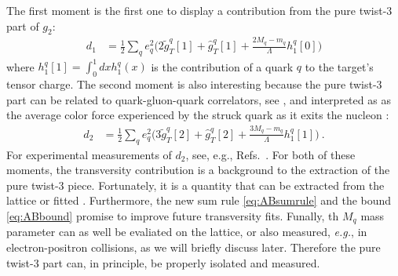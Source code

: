 \documentclass[preprintnumbers,floatfix,nofootinbib]{revtex4}
\newcommand{\eg}{{\em e.g.}}
\newcommand{\mj}{M_q}
\newcommand{\mq}{m_q}
\begin{document}
The first moment is the first one to display a contribution from the pure twist-3 part of $g_2$:
\begin{align}
  d_1 & = \frac12 \sum_q e_q^2 \bigg( 2 \tilde g_T^q[1] + \hat g_T^q[1]
    + \frac{2\mj-\mq}{\Lambda} h_1^q[0] \bigg)
\label{e:d1}
\end{align}
where $h_1^q[1] = \int_0^1 dx h_1^q(x)$ is the contribution of a quark $q$ to the target's tensor charge. 
The second moment is also interesting because the pure twist-3 part can be
related to quark-gluon-quark correlators, see \cite{Jaffe:1996zw}, and
interpreted as as the average color force experienced by the struck quark as
it exits the nucleon \cite{Burkardt:2012sd}: 
\begin{align}
  d_2 & = \frac12 \sum_q e_q^2 \bigg( 3 \tilde g_T^q[2] + \hat g_T^q[2]
    + \frac{3\mj-\mq}{\Lambda} h_1^q[1] \bigg) \ .
\end{align}
For experimental
measurements of $d_2$, see, e.g., Refs.~\cite{Anthony:2002hy,Slifer:2008xu,Solvignon:2013yun,Posik:2014usi,Flay:2016wie}.
For both of these moments, the transversity contribution is a background to the extraction of the pure twist-3 piece. Fortunately, it is a quantity that can be extracted from the lattice
\cite{Green:2012ej,Bali:2014nma,Bhattacharya:2015wna,Abdel-Rehim:2015owa,Bhattacharya:2016zcn} or fitted
\cite{Radici:2015mwa,Anselmino:2015sxa,Kang:2015msa}.
Furthermore, the new sum rule \eqref{eq:ABsumrule} and the bound
\eqref{eq:ABbound} promise to improve future transversity fits. Funally, th $\mj$ mass parameter can as well be evaliated on the lattice, or also measured, \eg, in electron-positron collisions, as we will briefly discuss later. Therefore the pure twist-3 part can, in principle, be properly isolated and measured.
\end{document}
